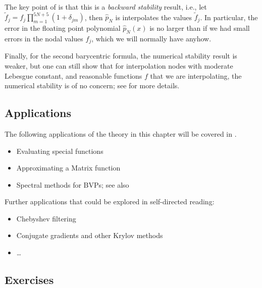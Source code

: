 The key point of  is that this is a {\em backward
stability} result, i.e., let $\tilde{f}_j = f_j\prod_{m = 1}^{5N+5}
(1+\delta_{jm})$, then $\hat{p}_N$ is interpolates the values $\tilde{f}_j$. 
In particular, the error in the floating point polynomial $\hat{p}_N(x)$ 
is no larger than if we had small errors in the nodal values $f_j$, which 
we will normally have anyhow. 

Finally, for the second barycentric formula, the numerical stability result is
weaker, but one can still show that for interpolation nodes with moderate
Lebesgue constant, and reasonable functions $f$ that we are interpolating, the
numerical stability is of no concern; see \cite{Higham2004-fn} for more details.



\subsection{Applications}

The following applications of the theory in this chapter will be 
covered in \nbpoly.

\begin{itemize}
   \item Evaluating special functions
   \item Approximating a Matrix function
   \item Spectral methods for BVPs; see also \cite[Sec. 21]{Trefethen2013-rg}
\end{itemize}

\noindent Further applications that could be explored in self-directed reading: 
\begin{itemize}
   \item Chebyshev filtering 
   \item Conjugate gradients and other Krylov methods 
   \item \dots 
\end{itemize}

\subsection{Exercises}
%


   
